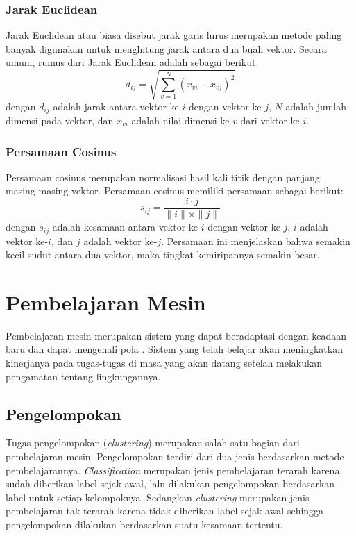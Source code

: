 \subsubsection{Jarak Euclidean}
\label{sub:euclideanDist}
Jarak Euclidean atau biasa disebut jarak garis lurus merupakan metode paling banyak digunakan untuk menghitung jarak antara dua buah vektor. Secara umum, rumus dari Jarak Euclidean adalah sebagai berikut:
\begin{equation}
d_{ij}=\sqrt{\sum_{v=1}^N (x_{vi}-x_{vj})^2}
\end{equation}
dengan $d_{ij}$ adalah jarak antara vektor ke-$i$ dengan vektor ke-$j$, $N$ adalah jumlah dimensi pada vektor, dan $x_{vi}$ adalah nilai dimensi ke-$v$ dari vektor ke-$i$.

\subsubsection{Persamaan Cosinus}
\label{sub:cosineDist}
Persamaan cosinus merupakan normalisasi hasil kali titik dengan panjang masing-masing vektor. Persamaan cosinus memiliki persamaan sebagai berikut:
\begin{equation}
s_{ij}=\frac{i\cdot j}{\parallel i \parallel \times \parallel j \parallel}
\end{equation}
dengan $s_{ij}$ adalah kesamaan antara vektor ke-$i$ dengan vektor ke-$j$, $i$ adalah vektor ke-$i$, dan $j$ adalah vektor ke-$j$. Persamaan ini menjelaskan bahwa semakin kecil sudut antara dua vektor, maka tingkat kemiripannya semakin besar.

\section{Pembelajaran Mesin}
Pembelajaran mesin merupakan sistem yang dapat beradaptasi dengan keadaan baru dan dapat mengenali pola \cite{russell2016artificial}. Sistem yang telah belajar akan meningkatkan kinerjanya pada tugas-tugas di masa yang akan datang setelah melakukan pengamatan tentang lingkungannya. 

\subsection{Pengelompokan}
Tugas pengelompokan (\textit{clustering}) merupakan salah satu bagian dari pembelajaran mesin. Pengelompokan terdiri dari dua jenis berdasarkan metode pembelajarannya. \textit{Classification} merupakan jenis pembelajaran terarah karena sudah diberikan label sejak awal, lalu dilakukan pengelompokan berdasarkan label untuk setiap kelompoknya. Sedangkan \textit{clustering} merupakan jenis pembelajaran tak terarah karena tidak diberikan label sejak awal sehingga pengelompokan dilakukan berdasarkan suatu kesamaan tertentu.

